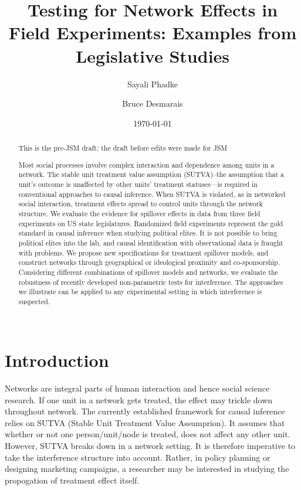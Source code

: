 \documentclass[12pt]{article}
\title{\vspace{-2cm} Testing for Network Effects in Field Experiments: Examples from Legislative Studies }
\author{ Sayali Phadke \and Bruce Desmarais} \date{\today}
\begin{document}
\maketitle




\begin{abstract}

This is the pre-JSM draft; the draft before edits were made for JSM

\noindent  Most social processes involve complex interaction and dependence among units in a network. The stable unit treatment value assumption (SUTVA)--the assumption that a unit’s outcome is unaffected by other units’ treatment statuses—is required in conventional approaches to causal inference. When SUTVA is violated, as in networked social interaction, treatment effects spread to control units through the network structure. We evaluate the evidence for spillover effects in data from three field experiments on US state legislatures. Randomized field experiments represent the gold standard in causal inference when studying political elites. It is not possible to bring political elites into the lab, and causal identification with observational data is fraught with problems. We propose new specifications for treatment spillover models, and construct networks through geographical or ideological proximity and co-sponsorship. Considering different combinations of spillover models and networks, we evaluate the robustness of recently developed non-parametric tests for interference. The approaches we illustrate can be applied to any experimental setting in which interference is suspected. \\~\\

\end{abstract}

\thispagestyle{empty}
\doublespacing

\section{Introduction}

Networks are integral parts of human interaction and hence social science research. If one unit in a network gets treated, the effect may trickle down throughout network. The currently established framework for causal inference relies on SUTVA (Stable Unit Treatment Value Assumprion). It assumes that whether or not one person/unit/node is treated, does not affect any other unit. However, SUTVA breaks down in a network setting. It is therefore imperative to take the interference structure into account. Rather, in policy planning or designing marketing campaigns, a researcher may be interested in studying the propogation of treatment effect itself.
\end{document}
